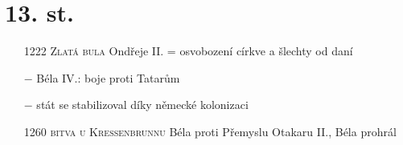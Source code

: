 \documentclass{article}
\begin{document}
\section*{13. st.}
\begin{itemize}
    \vspace{-0.5em}
    \setlength\itemsep{0.15em}
    \item[1222] \textsc{Zlatá bula} Ondřeje II. = osvobození církve a šlechty od daní
    \item[$-$] Béla IV.: boje proti Tatarům
    \item[$-$] stát se stabilizoval díky německé kolonizaci
    \item[1260] \textsc{bitva u Kressenbrunnu} Béla proti Přemyslu Otakaru II., Béla prohrál  
\end{itemize}
\end{document}
